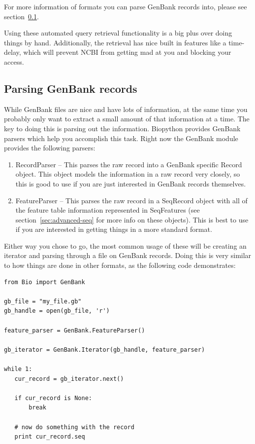 \documentclass{report}
\begin{document}
For more information of formats you can parse GenBank records into, please see section~\ref{sec:gb-parsing}.


Using these automated query retrieval functionality is a big plus over doing things by hand. Additionally, the retrieval has nice built in features like a time-delay, which will prevent NCBI from getting mad at you and blocking your access.

\subsection{Parsing GenBank records}
\label{sec:gb-parsing}

While GenBank files are nice and have lots of information, at the same time you probably only want to extract a small amount of that information at a time. The key to doing this is parsing out the information. Biopython provides GenBank parsers which help you accomplish this task. Right now the GenBank module provides the following parsers:

\begin{enumerate}
  \item RecordParser -- This parses the raw record into a GenBank specific Record object. This object models the information in a raw record very closely, so this is good to use if you are just interested in GenBank records themselves.

  \item FeatureParser -- This parses the raw record in a SeqRecord object with all of the feature table information represented in SeqFeatures (see section~\ref{sec:advanced-seq} for more info on these objects). This is best to use if you are interested in getting things in a more standard format.
\end{enumerate}

Either way you chose to go, the most common usage of these will be creating an iterator and parsing through a file on GenBank records. Doing this is very similar to how things are done in other formats, as the following code demonstrates:

\begin{verbatim}
from Bio import GenBank

gb_file = "my_file.gb"
gb_handle = open(gb_file, 'r')

feature_parser = GenBank.FeatureParser()

gb_iterator = GenBank.Iterator(gb_handle, feature_parser)

while 1:
   cur_record = gb_iterator.next()

   if cur_record is None:
       break

   # now do something with the record
   print cur_record.seq
\end{verbatim}
\end{document}
